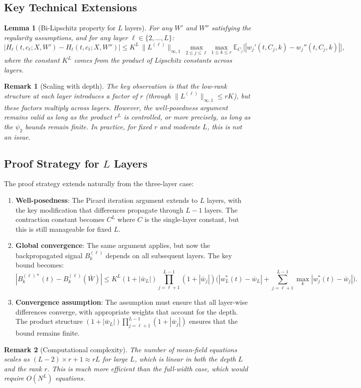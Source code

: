 \documentclass[11pt]{article}
\newcommand{\E}{\mathbb{E}}
\newcommand{\1}{\mathbbm{1}}
\newtheorem{lemma}{Lemma}
\newtheorem{remark}{Remark}
\begin{document}
\subsection{Key Technical Extensions}

\begin{lemma}[Bi-Lipschitz property for $L$ layers]\label{lem:bilipschitz-Llayers}
For any $W'$ and $W''$ satisfying the regularity assumptions, and for any layer $\ell\in\{2,\dots,L\}$:
\[
\big|H_\ell(t,c_\ell;X,W')-H_\ell(t,c_\ell;X,W'')\big| \le K^L\,\|L^{(\ell)}\|_{\infty,1}\,\max_{2\le j\le \ell}\max_{1\le k\le r}\E_{C_j}\big[|w_j'(t,C_j,k)-w_j''(t,C_j,k)|\big],
\]
where the constant $K^L$ comes from the product of Lipschitz constants across layers.
\end{lemma}

\begin{remark}[Scaling with depth]
The key observation is that the low-rank structure at each layer introduces a factor of $r$ (through $\|L^{(\ell)}\|_{\infty,1}\le rK$), but these factors multiply across layers. However, the well-posedness argument remains valid as long as the product $r^L$ is controlled, or more precisely, as long as the $\psi_2$ bounds remain finite. In practice, for fixed $r$ and moderate $L$, this is not an issue.
\end{remark}

\subsection{Proof Strategy for $L$ Layers}

The proof strategy extends naturally from the three-layer case:

\begin{enumerate}
\item \textbf{Well-posedness}: The Picard iteration argument extends to $L$ layers, with the key modification that differences propagate through $L-1$ layers. The contraction constant becomes $C^L$ where $C$ is the single-layer constant, but this is still manageable for fixed $L$.

\item \textbf{Global convergence}: The same argument applies, but now the backpropagated signal $B_k^{(\ell)}$ depends on all subsequent layers. The key bound becomes:
\[
|B_k^{(\ell)*}(t)-B_k^{(\ell)}(\bar{W})| \le K^L(1+|\bar{w}_L|)\prod_{j=\ell+1}^{L-1}(1+|\bar{w}_j|)\Big(|w_L^*(t)-\bar{w}_L| + \sum_{j=\ell+1}^{L-1}\max_k|w_j^*(t)-\bar{w}_j|\Big).
\]

\item \textbf{Convergence assumption}: The assumption must ensure that all layer-wise differences converge, with appropriate weights that account for the depth. The product structure $(1+|\bar{w}_L|)\prod_{j=\ell+1}^{L-1}(1+|\bar{w}_j|)$ ensures that the bound remains finite.
\end{enumerate}

\begin{remark}[Computational complexity]
The number of mean-field equations scales as $(L-2)\times r + 1 \approx rL$ for large $L$, which is linear in both the depth $L$ and the rank $r$. This is much more efficient than the full-width case, which would require $O(N^L)$ equations.
\end{remark}
\end{document}
